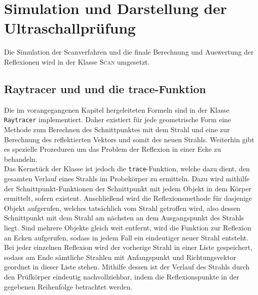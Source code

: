 \documentclass[12pt,a4paper]{scrartcl}
\begin{document}
\section{Simulation und Darstellung der Ultraschallprüfung}
Die Simulation der Scanverfahren und die finale Berechnung und Auswertung der Reflexionen wird in der Klasse \textsc{Scan} umgesetzt. %

\subsection{Raytracer und und die trace-Funktion}
Die im vorangegangenen Kapitel hergeleiteten Formeln sind in der Klasse \texttt{Raytracer} implementiert. Daher existiert für jede geometrische Form eine Methode zum Berechnen des Schnittpunktes mit dem Strahl und eine zur Berechnung des reflektierten Vektors und somit des neuen Strahls. Weiterhin gibt es spezielle Prozeduren um das Problem der Reflexion in einer Ecke zu behandeln.\\
Das Kernstück der Klasse ist jedoch die \texttt{trace}-Funktion, welche dazu dient, den gesamten Verlauf eines Strahls im Probekörper zu ermitteln. Dazu wird mithilfe der Schnittpunkt-Funktionen der Schnittpunkt mit jedem Objekt in dem Körper ermittelt, sofern existent. Anschließend wird die Reflexionsmethode für dasjenige Objekt aufgerufen, welches tatsächlich vom Strahl getroffen wird, also dessen Schnittpunkt mit dem Strahl am nächsten an dem Ausgangspunkt des Strahls liegt. Sind mehrere Objekte gleich weit entfernt, wird die Funktion zur Reflexion an Ecken aufgerufen, sodass in jedem Fall ein eindeutiger neuer Strahl entsteht.\\
Bei jeder einzelnen Reflexion wird der vorherige Strahl in einer Liste gespeichert, sodass am Ende sämtliche Strahlen mit Anfangspunkt und Richtungsvektor geordnet in dieser Liste stehen. Mithilfe dessen ist der Verlauf des Strahls durch den Prüfkörper eindeutig nachvollziehbar, indem die Reflexionspunkte in der gegebenen Reihenfolge betrachtet werden.
\end{document}
